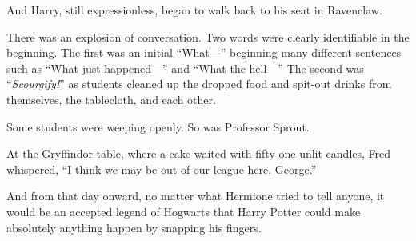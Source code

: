 And Harry, still expressionless, began to walk back to his seat in Ravenclaw.

There was an explosion of conversation. Two words were clearly identifiable in the beginning. The first was an initial “What—” beginning many different sentences such as “What just happened—” and “What the hell—” The second was “\emph{Scourgify!}” as students cleaned up the dropped food and spit-out drinks from themselves, the tablecloth, and each other.

Some students were weeping openly. So was Professor Sprout.

At the Gryffindor table, where a cake waited with fifty-one unlit candles, Fred whispered, “I think we may be out of our league here, George.”

And from that day onward, no matter what Hermione tried to tell anyone, it would be an accepted legend of Hogwarts that Harry Potter could make absolutely anything happen by snapping his fingers.

